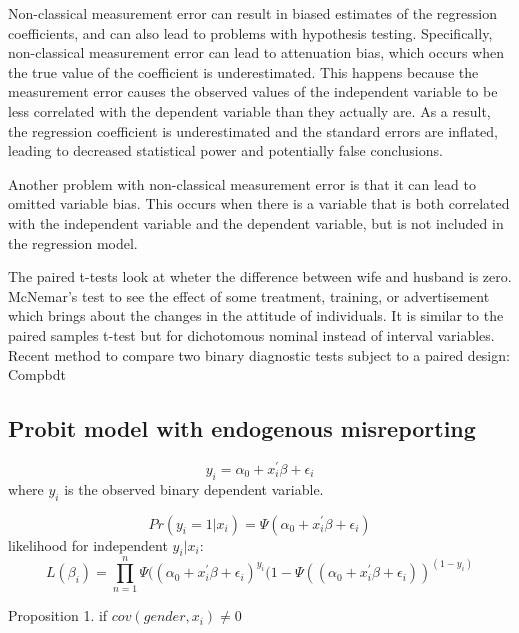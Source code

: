 \documentclass[12pt]{article}
\begin{document}
	Non-classical measurement error can result in biased estimates of the regression coefficients, and can also lead to problems with hypothesis testing. Specifically, non-classical measurement error can lead to attenuation bias, which occurs when the true value of the coefficient is underestimated. This happens because the measurement error causes the observed values of the independent variable to be less correlated with the dependent variable than they actually are. As a result, the regression coefficient is underestimated and the standard errors are inflated, leading to decreased statistical power and potentially false conclusions.
	
	Another problem with non-classical measurement error is that it can lead to omitted variable bias. This occurs when there is a variable that is both correlated with the independent variable and the dependent variable, but is not included in the regression model.
	
	
	The paired t-tests look at wheter the difference between wife and husband is zero. \\
	McNemar's test to see the effect of some treatment, training, or advertisement which brings about the changes in the attitude of individuals. It is similar to the paired samples t-test but for dichotomous nominal instead of interval variables.\\
	
	Recent method to compare two binary diagnostic tests subject to a paired design: Compbdt
	\subsection{Probit model with endogenous misreporting}
\begin{equation} \label{eq1}
	y_i=\alpha_0 + x_i^{'} \beta +\epsilon_i
\end{equation}
where $y_i$ is the observed binary dependent variable. 

\begin{equation}
	Pr(y_i=1|x_i) = \Psi(\alpha_0 + x_i^{'} \beta +\epsilon_i)
\end{equation}
likelihood for independent $y_i|x_i$:
\begin{equation}
	L(\beta_i)=\prod_{n=1}^{n}\Psi((\alpha_0 + x_i^{'} \beta +\epsilon_i)^{y_i}(1-\Psi((\alpha_0 + x_i^{'} \beta +\epsilon_i))^{(1-y_i)}
\end{equation}


Proposition 1. if $cov(gender, x_i) \neq 0 $
\end{document}
